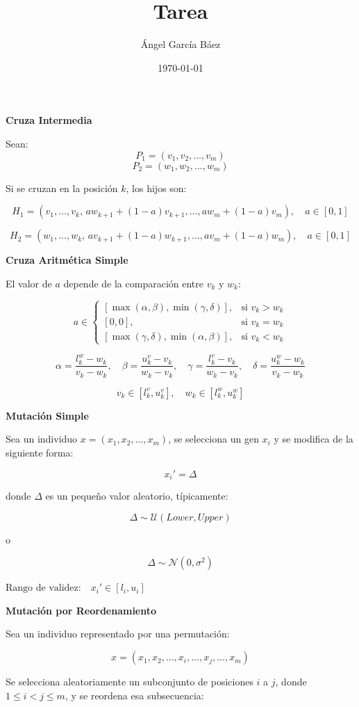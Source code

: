 \documentclass[11pt, letterpaper]{article}
\title{\bfseries Tarea}
\author{Ángel García Báez}
\date{\today}
\begin{document}
	
\textbf{Cruza Intermedia}

Sean:
\[
P_1 = (v_1, v_2, \ldots, v_m)
\]
\[
P_2 = (w_1, w_2, \ldots, w_m)
\]

Si se cruzan en la posición \( k \), los hijos son:

\[
H_1 = (v_1, \ldots, v_k, \, a w_{k+1} + (1-a) v_{k+1}, \ldots, a w_m + (1-a) v_m), \quad a \in [0, 1]
\]

\[
H_2 = (w_1, \ldots, w_k, \, a v_{k+1} + (1-a) w_{k+1}, \ldots, a v_m + (1-a) w_m), \quad a \in [0, 1]
\]

\textbf{Cruza Aritmética Simple}

El valor de \( a \) depende de la comparación entre \( v_k \) y \( w_k \):

\[
a \in
\begin{cases}
	\left[ \max(\alpha, \beta), \min(\gamma, \delta) \right], & \text{si } v_k > w_k \\
	[0, 0], & \text{si } v_k = w_k \\
	\left[ \max(\gamma, \delta), \min(\alpha, \beta) \right], & \text{si } v_k < w_k
\end{cases}
\]

\[
\alpha = \frac{l_k^w - w_k}{v_k - w_k}, \quad
\beta = \frac{u_k^v - v_k}{w_k - v_k}, \quad
\gamma = \frac{l_k^v - v_k}{w_k - v_k}, \quad
\delta = \frac{u_k^w - w_k}{v_k - w_k}
\]

\[
v_k \in [l_k^v, u_k^v], \quad
w_k \in [l_k^w, u_k^w]
\]


\textbf{Mutación Simple}

Sea un individuo \( x = (x_1, x_2, \ldots, x_m) \), se selecciona un gen \( x_i \) y se modifica de la siguiente forma:

\[
x_i' =  \Delta
\]

donde \( \Delta \) es un pequeño valor aleatorio, típicamente:

\[
\Delta \sim \mathcal{U}(Lower, Upper)
\]

o

\[
\Delta \sim \mathcal{N}(0, \sigma^2)
\]

$\text{Rango de validez:} \quad x_i' \in [l_i, u_i]$


\textbf{Mutación por Reordenamiento}

Sea un individuo representado por una permutación:

\[
x = (x_1, x_2, \ldots, x_i, \ldots, x_j, \ldots, x_m)
\]

Se selecciona aleatoriamente un subconjunto de posiciones \( i \) a \( j \), donde \( 1 \leq i < j \leq m \), y se reordena esa subsecuencia:
\end{document}

